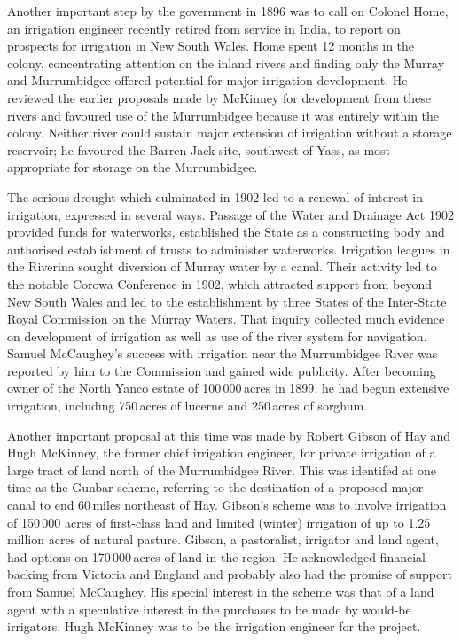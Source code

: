 Another important step by the government in 1896 was to call on
Colonel Home,  an irrigation engineer recently
retired from service in India, to report on prospects for irrigation
in New South Wales.  Home spent 12 months in the colony, concentrating
attention on the inland rivers and finding only the Murray and
Murrumbidgee offered potential for major irrigation development.  He
reviewed the earlier proposals made by McKinney for development from
these rivers and favoured use of the Murrumbidgee because it was
entirely within the colony. Neither river could sustain major
extension of irrigation without a storage reservoir; he favoured the
Barren Jack site, southwest of Yass, as most appropriate for storage
on the Murrumbidgee.

The serious drought which culminated in 1902 led to a renewal of
interest in irrigation, expressed in several ways.  Passage of the
Water and Drainage Act 1902 provided funds for waterworks, established
the State as a constructing body and authorised establishment of
trusts to administer waterworks.  Irrigation leagues in the Riverina
sought diversion of Murray water by a canal.  Their activity led to
the notable Corowa Conference in 1902, which attracted support from
beyond New South Wales and led to the establishment by three States of
the Inter-State Royal Commission on the Murray Waters.  That inquiry
collected much evidence on development of irrigation as well as use of
the river system for navigation. Samuel McCaughey's success with
irrigation near the Murrumbidgee River was reported by him to the
Commission and gained wide publicity. After becoming owner of the
North Yanco \index{North Yanco estate} estate of 100\,000\,acres in
1899, he had begun extensive irrigation, including 750\,acres of
lucerne and 250\,acres of sorghum.


Another important proposal at this time was made by Robert Gibson
\index{Gibson, R.} of Hay and Hugh McKinney, \index{KcKinney, H.} the
former chief irrigation engineer, for private irrigation of a large
tract of land north of the Murrumbidgee
River.  This was identifed at one time as
the Gunbar scheme, referring to the destination of a proposed major
canal to end 60\,miles northeast of Hay.  Gibson's scheme was to
involve irrigation of 150\,000 acres of first-class land and limited
(winter) irrigation of up to 1.25 million acres of natural pasture.
Gibson, a pastoralist, irrigator and land agent, had options on
170\,000\,acres of land in the region.  He acknowledged financial
backing from Victoria and England and probably also had the promise of
support from Samuel McCaughey.  His special interest in the scheme was
that of a land agent with a speculative interest in the purchases to
be made by would-be irrigators.  Hugh McKinney was to be the
irrigation engineer for the project.

